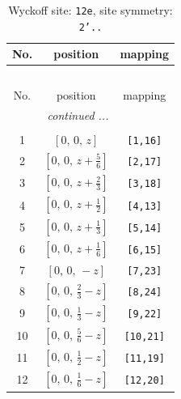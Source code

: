 \documentclass[fleqn,8pt]{jsarticle}
\begin{document}
\begin{longtable}{ccc}
\caption{Wyckoff site: {\tt 12e}, site symmetry: {\tt 2'..}}
 \\
 \hline \hline
No. & position & mapping \\ \hline \endfirsthead

\multicolumn{2}{l}{\tablename\ \thetable{}} \\
 \hline \hline
No. & position & mapping \\ \hline \endhead

 \hline \hline
\multicolumn{2}{r}{\footnotesize\it continued ...} \\ \endfoot

 \hline \hline
\multicolumn{2}{r}{} \\ \endlastfoot

1 & $\left[ 0,\, 0,\, z \right]$ & {\tt [1,16]} \\ \hline
2 & $\left[ 0,\, 0,\, z + \frac{5}{6} \right]$ & {\tt [2,17]} \\ \hline
3 & $\left[ 0,\, 0,\, z + \frac{2}{3} \right]$ & {\tt [3,18]} \\ \hline
4 & $\left[ 0,\, 0,\, z + \frac{1}{2} \right]$ & {\tt [4,13]} \\ \hline
5 & $\left[ 0,\, 0,\, z + \frac{1}{3} \right]$ & {\tt [5,14]} \\ \hline
6 & $\left[ 0,\, 0,\, z + \frac{1}{6} \right]$ & {\tt [6,15]} \\ \hline
7 & $\left[ 0,\, 0,\, - z \right]$ & {\tt [7,23]} \\ \hline
8 & $\left[ 0,\, 0,\, \frac{2}{3} - z \right]$ & {\tt [8,24]} \\ \hline
9 & $\left[ 0,\, 0,\, \frac{1}{3} - z \right]$ & {\tt [9,22]} \\ \hline
10 & $\left[ 0,\, 0,\, \frac{5}{6} - z \right]$ & {\tt [10,21]} \\ \hline
11 & $\left[ 0,\, 0,\, \frac{1}{2} - z \right]$ & {\tt [11,19]} \\ \hline
12 & $\left[ 0,\, 0,\, \frac{1}{6} - z \right]$ & {\tt [12,20]} \\
\end{longtable}
\renewcommand{\arraystretch}{1.2}
\end{document}
